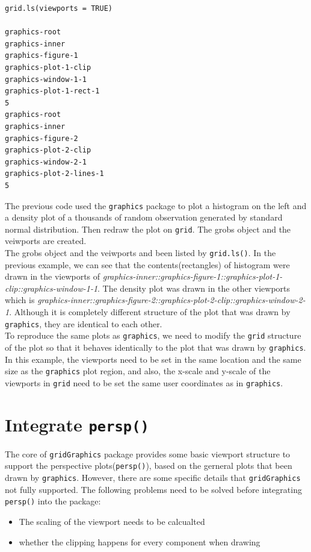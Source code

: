 \documentclass[paper=a4, fontsize=11pt]{report}
\begin{document}
\newpage
\begin{lstlisting}
grid.ls(viewports = TRUE)

graphics-root
graphics-inner
graphics-figure-1
graphics-plot-1-clip
graphics-window-1-1
graphics-plot-1-rect-1
5
graphics-root
graphics-inner
graphics-figure-2
graphics-plot-2-clip
graphics-window-2-1
graphics-plot-2-lines-1
5

\end{lstlisting}
The previous code used the \texttt{graphics} package to plot a histogram on the left and a density plot of a 
thousands of random observation generated by standard normal distribution. Then redraw the plot on \texttt{grid}. The grobs object and the veiwports are created. \\

The grobs object and the veiwports and been listed by \texttt{grid.ls()}. In the previous example, we can see that the contents(rectangles) of histogram were drawn in the viewports of \textit{graphics-inner::graphics-figure-1::graphics-plot-1-clip::graphics-window-1-1}. The density plot was drawn in the other viewports which is \textit{graphics-inner::graphics-figure-2::graphics-plot-2-clip::graphics-window-2-1}. Although it is completely different structure of the plot that was drawn by \texttt{graphics}, they are identical to each other.\\

To reproduce the same plots as \texttt{graphics}, we need to modify the \texttt{grid} structure of the plot so that it behaves identically to the plot that was drawn by \texttt{graphics}. In this example, the viewports need to be set in the same location and the same size as the \texttt{graphics} plot region, and also, the x-scale and y-scale of the viewports in \texttt{grid} need to be set the same user coordinates as in \texttt{graphics}.\\

\section{Integrate \texttt{persp()}}
The core of \texttt{gridGraphics} package provides some basic viewport structure to support the perspective plots(\texttt{persp()}), based on the gerneral plots that been drawn by \texttt{graphics}. However, there are some specific details that \texttt{gridGraphics} not fully supported. The following problems need to be solved before integrating \texttt{persp()} into the package:
\begin{itemize}
	\item{The scaling of the viewport needs to be calcualted}
	\item{whether the clipping happens for every component when drawing}
\end{itemize}
\end{document}
